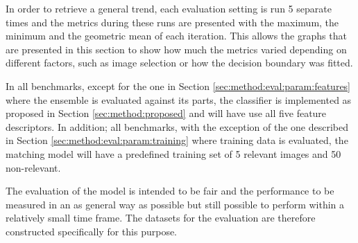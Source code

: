 In order to retrieve a general trend, each evaluation setting is run 5 separate times and the metrics during these runs are presented with the maximum, the minimum and the geometric mean of each iteration. This allows the graphs that are presented in this section to show how much the metrics varied depending on different factors, such as image selection or how the decision boundary was fitted.

In all benchmarks, except for the one in Section \ref{sec:method:eval:param:features} where the ensemble is evaluated against its parts, the classifier is implemented as proposed in Section \ref{sec:method:proposed} and will have use all five feature descriptors. In addition; all benchmarks, with the exception of the one described in Section \ref{sec:method:eval:param:training} where training data is evaluated, the matching model will have a predefined training set of 5 relevant images and 50 non-relevant.

The evaluation of the model is intended to be fair and the performance to be measured in an as general way as possible but still possible to perform within a relatively small time frame. The datasets for the evaluation are therefore constructed specifically for this purpose. 






